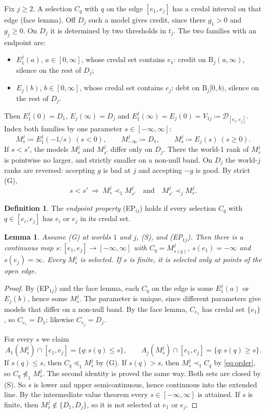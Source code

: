 \documentclass[11pt]{article}
\newtheorem{lemma}[theorem]{Lemma}
\theoremstyle{definition}\newtheorem{definition}[theorem]{Definition}
\theoremstyle{remark}\newtheorem{remark}[theorem]{Remark}
\newcommand{\Dscr}{\mathcal D}
\newcommand{\Band}{\mathrm{B}}
\begin{document}
Fix $j\ge2$. A selection $C_q$ with $q$ on the edge $[e_1,e_j]$ has a credal
interval on that edge (face lemma). Off $D_j$ such a model gives credit,
since there $g_1>0$ and $g_j\ge0$. On $D_j$ it is determined by two
thresholds in $t_j$. The two families with an endpoint are:
\begin{itemize}[leftmargin=*,itemsep=1pt]
\item $E^j_1(a)$, $a\in[0,\infty]$, whose credal set contains $e_1$: credit
on $\Band_j(a,\infty)$, silence on the rest of $D_j$;
\item $E_j(b)$, $b\in[0,\infty]$, whose credal set contains $e_j$: debt on
$\Band_j[0,b)$, silence on the rest of $D_j$.
\end{itemize}
Then $E^j_1(0)=D_1$, $E_j(\infty)=D_j$ and
$E^j_1(\infty)=E_j(0)=V_{1j}\coloneqq\Dscr_{[e_1,e_j]}$. Index both families
by one parameter $s\in[-\infty,\infty]$:
\[
 M^j_s\coloneqq E^j_1(-1/s)\ (s<0),\qquad M^j_{-\infty}\coloneqq D_1,\qquad
 M^j_s\coloneqq E_j(s)\ (s\ge0).
\]
If $s<s'$, the models $M^j_s$ and $M^j_{s'}$ differ only on $D_j$. There the
world-1 rank of $M^j_s$ is pointwise no larger, and strictly smaller on a
non-null band. On $D_j$ the world-$j$ ranks are reversed: accepting $g$ is
bad at $j$ and accepting $-g$ is good. By strict (G),
\begin{equation}
 s<s'\ \Longrightarrow\ M^j_s\prec_1M^j_{s'}\quad\text{and}\quad
 M^j_{s'}\prec_jM^j_s.
 \label{eq:order}
\end{equation}

\begin{definition}\label{def:EP}
The \emph{endpoint property} (EP$_{ij}$) holds if every selection $C_q$ with
$q\in[e_i,e_j]$ has $e_i$ or $e_j$ in its credal set.
\end{definition}

\begin{lemma}\label{lem:edge}
Assume (G) at worlds $1$ and $j$, (S), and (EP$_{1j}$). Then there is a
continuous map $s\colon[e_1,e_j]\to[-\infty,\infty]$ with $C_q=M^j_{s(q)}$,
$s(e_1)=-\infty$ and $s(e_j)=\infty$. Every $M^j_s$ is selected. If $s$ is
finite, it is selected only at points of the open edge.
\end{lemma}
\begin{proof}
By (EP$_{1j}$) and the face lemma, each $C_q$ on the edge is some $E^j_1(a)$
or $E_j(b)$, hence some $M^j_s$. The parameter is unique, since different
parameters give models that differ on a non-null band. By the face lemma,
$C_{e_1}$ has credal set $\{e_1\}$, so $C_{e_1}=D_1$; likewise $C_{e_j}=D_j$.

For every $s$ we claim
\[
 A_1(M^j_s)\cap[e_1,e_j]=\{q:s(q)\le s\},\qquad
 A_j(M^j_s)\cap[e_1,e_j]=\{q:s(q)\ge s\}.
\]
If $s(q)\le s$, then $C_q\preceq_1M^j_s$ by (G). If $s(q)>s$, then
$M^j_s\prec_1C_q$ by \eqref{eq:order}, so $C_q\not\preceq_1M^j_s$. The second
identity is proved the same way. Both sets are closed by (S). So $s$ is lower
and upper semicontinuous, hence continuous into the extended line. By the
intermediate value theorem every $s\in[-\infty,\infty]$ is attained. If $s$
is finite, then $M^j_s\notin\{D_1,D_j\}$, so it is not selected at $e_1$ or
$e_j$.
\end{proof}
\end{document}
